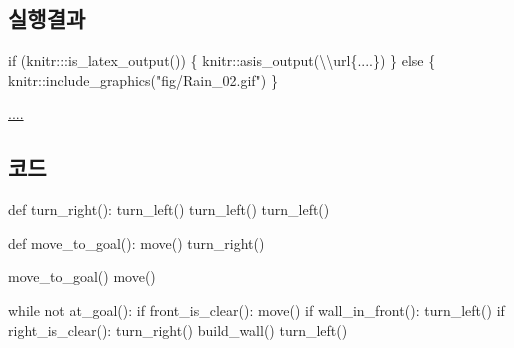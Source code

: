 \documentclass[
  b5paperpaper,
  DIV=11,
  numbers=noendperiod]{scrreprt}
\newenvironment{Shaded}{\begin{snugshade}}{\end{snugshade}}
\newcommand{\ControlFlowTok}[1]{\textcolor[rgb]{0.00,0.23,0.31}{#1}}
\newcommand{\FunctionTok}[1]{\textcolor[rgb]{0.28,0.35,0.67}{#1}}
\newcommand{\NormalTok}[1]{\textcolor[rgb]{0.00,0.23,0.31}{#1}}
\newcommand{\SpecialCharTok}[1]{\textcolor[rgb]{0.37,0.37,0.37}{#1}}
\newcommand{\StringTok}[1]{\textcolor[rgb]{0.13,0.47,0.30}{#1}}
\begin{document}
\hypertarget{uxc2e4uxd589uxacb0uxacfc-21}{%
\subsection{실행결과}\label{uxc2e4uxd589uxacb0uxacfc-21}}

\begin{Shaded}
\begin{Highlighting}[]
\ControlFlowTok{if}\NormalTok{ (knitr}\SpecialCharTok{:::}\FunctionTok{is\_latex\_output}\NormalTok{()) \{}
\NormalTok{  knitr}\SpecialCharTok{::}\FunctionTok{asis\_output}\NormalTok{(}\StringTok{\textquotesingle{}}\SpecialCharTok{\textbackslash{}\textbackslash{}}\StringTok{url\{....\}\textquotesingle{}}\NormalTok{)}
\NormalTok{\} }\ControlFlowTok{else}\NormalTok{ \{}
\NormalTok{  knitr}\SpecialCharTok{::}\FunctionTok{include\_graphics}\NormalTok{(}\StringTok{"fig/Rain\_02.gif"}\NormalTok{)}
\NormalTok{\}}
\end{Highlighting}
\end{Shaded}

\url{....}

\hypertarget{uxcf54uxb4dc-21}{%
\subsection{코드}\label{uxcf54uxb4dc-21}}

\begin{Shaded}
\begin{Highlighting}[]
\NormalTok{def }\FunctionTok{turn\_right}\NormalTok{()}\SpecialCharTok{:}
    \FunctionTok{turn\_left}\NormalTok{()}
    \FunctionTok{turn\_left}\NormalTok{()}
    \FunctionTok{turn\_left}\NormalTok{()}

    
\NormalTok{def }\FunctionTok{move\_to\_goal}\NormalTok{()}\SpecialCharTok{:}
    \FunctionTok{move}\NormalTok{()}
    \FunctionTok{turn\_right}\NormalTok{()}

\FunctionTok{move\_to\_goal}\NormalTok{()}
\FunctionTok{move}\NormalTok{() }

\ControlFlowTok{while}\NormalTok{ not }\FunctionTok{at\_goal}\NormalTok{()}\SpecialCharTok{:}
    \ControlFlowTok{if} \FunctionTok{front\_is\_clear}\NormalTok{()}\SpecialCharTok{:}
        \FunctionTok{move}\NormalTok{()}
    \ControlFlowTok{if} \FunctionTok{wall\_in\_front}\NormalTok{()}\SpecialCharTok{:}
        \FunctionTok{turn\_left}\NormalTok{()}
    \ControlFlowTok{if} \FunctionTok{right\_is\_clear}\NormalTok{()}\SpecialCharTok{:}
        \FunctionTok{turn\_right}\NormalTok{()}
        \FunctionTok{build\_wall}\NormalTok{()}
        \FunctionTok{turn\_left}\NormalTok{()}
\end{Highlighting}
\end{Shaded}
\end{document}
